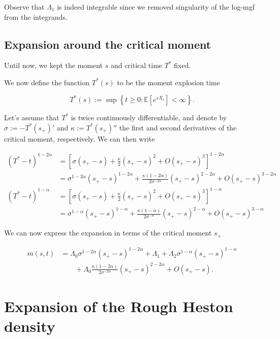 \documentclass[12pt]{article}
\theoremstyle{plain}
\begin{document}
Observe that $\Lambda_1$ is indeed integrable since we removed singularity of the log-mgf from the integrands.

\subsection{Expansion around the critical moment}

Until now, we kept the moment $s$ and critical time $T^*$ fixed.

We now define the function $T^*(s)$ to be the moment explosion time

$$
T^{*}(s):=\sup \left\{t \geq 0: \mathbb{E}\left[e^{s X_{t}}\right]<\infty\right\}.
$$

Let's assume that $T^*$ is twice continuously differentiable, and denote by $\sigma := -T^*(s_+)'$ and $\kappa := T^*(s_+)''$ the first and second derivatives of the critical moment, respectively. We can then write

$$
\begin{aligned}
(T^*-t)^{1-2\alpha} &= \left[\sigma (s_+ -s) + \frac \kappa 2 (s_+ - s)^2 + O(s_+-s)^3 \right]^{1-2\alpha}\\[5pt]
&=\sigma^{1-2\alpha}(s_+-s)^{1-2\alpha} + \frac{\kappa(1-2\alpha)}{2\sigma^{-2\alpha}} (s_+-s)^{2-2\alpha} + O(s_+-s)^{3-2\alpha}\\[20pt]
(T^*-t)^{1-\alpha}&=\left[\sigma (s_+ -s) + \frac \kappa 2 (s_+ - s)^2 + O(s_+-s)^3 \right]^{1-\alpha}\\[5pt]
&=\sigma^{1-\alpha}(s_+-s)^{1-\alpha}+\frac{\kappa(1-\alpha)}{2\sigma^{-\alpha}}(s_+-s)^{2-\alpha} + O(s_+-s)^{3-\alpha}
\end{aligned}
$$

We can now express the expansion in terms of the critical moment $s_+$

\begin{equation}\label{logmgfcriticalexpansion}
\begin{aligned}
m(s,t)&=\Lambda_0 \sigma^{1-2\alpha}(s_+-s)^{1-2\alpha} + \Lambda_1 + \Lambda_2\sigma^{1-\alpha}(s_+-s)^{1-\alpha} \\[5pt]
&\qquad+ \Lambda_0 \frac{\kappa (1-2\alpha)}{2\sigma^{-2\alpha}}(s_+-s)^{2-2\alpha} + O(s_+-s).
\end{aligned}
\end{equation}

\section{Expansion of the Rough Heston density}
\end{document}

